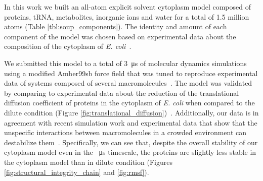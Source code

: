 \documentclass[journal=jpcisd8,manuscript=article]{achemso}
\begin{document}

In this work we built an all-atom explicit solvent cytoplasm model
composed of proteins, tRNA, metabolites, inorganic ions and water for a total
of 1.5 million atoms (Table \ref{tbl:soup_components}). The identity
and amount of each component of the model was chosen based on
experimental data about the composition of the cytoplasm of
\textit{E. coli}~\cite{Dong1996,Bennett2009,Link1997,Mcguffee2010}.

We submitted this model to a total of \SI{3}{\micro\second} of
molecular dynamics simulations using a modified Amber99sb force
field that was tuned to reproduce experimental data of systems
composed of several macromolecules~\cite{Best2014a}. The model was
validated by comparing to experimental data about the reduction of the
translational diffusion coefficient of proteins in the cytoplasm of
\textit{E. coli} when compared to the dilute condition (Figure
\ref{fig:translational_diffusion})~\cite{Elowitz1999,Konopka2006}. Additionally,
our data is in agreement with recent simulation work and experimental data
that show that the unspecific interactions between macromolecules in a
crowded environment can destabilize
them~\cite{Feig2011,miklos2011,Wang2012b}. Specifically, we can see
that, despite the overall stability of our cytoplasm model even in the
\SI{}{\micro\second} timescale, the proteins are slightly less stable
in the cytoplasm model than in dilute condition (Figures
\ref{fig:structural_integrity_chain} and \ref{fig:rmsf}).


\end{document}
